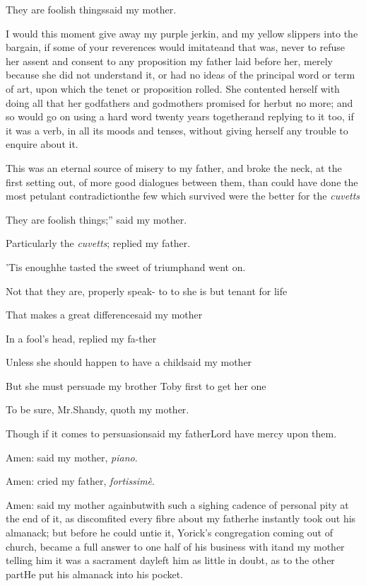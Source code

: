 \documentclass{article}
\begin{document}
\tsh They are foolish things\tsh said my
mother.

\noindent
{}
I would this moment give
away my purple jerkin, and my yellow slippers into the bargain, if
some of your reverences would imitate\tsk and that was, never to
refuse her assent and consent to any proposition my father laid
before her, merely because she did not understand it, or had no ideas of the principal word or term of art,
upon which the tenet or proposition rolled. She contented herself
with doing all that her godfathers and godmothers promised for
her\tsk but no more; and so would go on using a hard word twenty
years together\tsk and replying to it too, if it was a verb, in
all its moods and tenses, without giving herself any trouble to
enquire about it.

This was an eternal source of misery to my father, and broke the
neck, at the first setting out, of more good dialogues between
them, than could have done the most petulant
contradiction\tsh the few which survived were the better
for the \textit{cuvetts}\tsh

\tsk \lqq They are foolish things;” said my
mother.

\tsh Particularly the \textit{cuvetts}; replied my
father.

’Tis enough\tsk he tasted the sweet of triumph\tsk and
went on.

\tsk Not that they are, properly speak-\break
\hbox to 
\hbox to 
she is but tenant for life\tsh{}

\tsh That makes a great difference\tsk\break said my
mother\tsh

\tsk In a fool’s head, replied my fa-\break ther\tsh

Unless she should happen to have a child\tsk said my
mother\tsh

\tsh But she must persuade my brother Toby first
to get her one\tsk

\tsh To be sure, Mr.\@ Shandy, quoth my mother.

\tsh Though if it comes to persuasion\break\tsk said my
father\tsk Lord have mercy upon them.

Amen: said my mother, \textit{piano}.

Amen: cried my father, \textit{fortissimè}.

Amen: said my mother again\tsk but\break with such a sighing
cadence of personal pity at the end of it, as discomfited every
fibre about my father\tsk he instantly took out his almanack; but
before he could untie it, Yorick’s congregation coming
out of church, became a full answer to one half of his business
with it\tsk and my mother telling him it was a sacrament day\tsk left
him as little in doubt, as to the other part\tsk He put his
almanack into his pocket.
\end{document}

